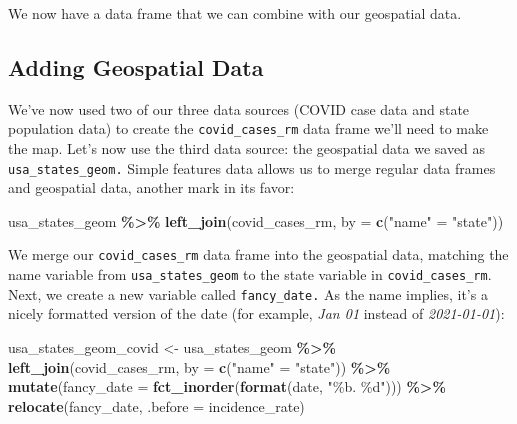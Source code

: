 \documentclass[
]{book}
\newenvironment{Shaded}{\begin{snugshade}}{\end{snugshade}}
\newcommand{\AttributeTok}[1]{\textcolor[rgb]{0.13,0.29,0.53}{#1}}
\newcommand{\FunctionTok}[1]{\textcolor[rgb]{0.13,0.29,0.53}{\textbf{#1}}}
\newcommand{\NormalTok}[1]{#1}
\newcommand{\OtherTok}[1]{\textcolor[rgb]{0.56,0.35,0.01}{#1}}
\newcommand{\SpecialCharTok}[1]{\textcolor[rgb]{0.81,0.36,0.00}{\textbf{#1}}}
\newcommand{\StringTok}[1]{\textcolor[rgb]{0.31,0.60,0.02}{#1}}
\begin{document}
We now have a data frame that we can combine with our geospatial data.

\hypertarget{adding-geospatial-data}{%
\subsection*{Adding Geospatial Data}\label{adding-geospatial-data}}

We've now used two of our three data sources (COVID case data and state population data) to create the \texttt{covid\_cases\_rm} data frame we'll need to make the map. Let's now use the third data source: the geospatial data we saved as \texttt{usa\_states\_geom.} Simple features data allows us to merge regular data frames and geospatial data, another mark in its favor:

\begin{Shaded}
\begin{Highlighting}[]
\NormalTok{usa\_states\_geom }\SpecialCharTok{\%\textgreater{}\%}
  \FunctionTok{left\_join}\NormalTok{(covid\_cases\_rm, }\AttributeTok{by =} \FunctionTok{c}\NormalTok{(}\StringTok{"name"} \OtherTok{=} \StringTok{"state"}\NormalTok{))}
\end{Highlighting}
\end{Shaded}

We merge our \texttt{covid\_cases\_rm} data frame into the geospatial data, matching the name variable from \texttt{usa\_states\_geom} to the state variable in \texttt{covid\_cases\_rm}. Next, we create a new variable called \texttt{fancy\_date.} As the name implies, it's a nicely formatted version of the date (for example, \emph{Jan 01} instead of \emph{2021-01-01}):

\begin{Shaded}
\begin{Highlighting}[]
\NormalTok{usa\_states\_geom\_covid }\OtherTok{\textless{}{-}}\NormalTok{ usa\_states\_geom }\SpecialCharTok{\%\textgreater{}\%}
  \FunctionTok{left\_join}\NormalTok{(covid\_cases\_rm, }\AttributeTok{by =} \FunctionTok{c}\NormalTok{(}\StringTok{"name"} \OtherTok{=} \StringTok{"state"}\NormalTok{)) }\SpecialCharTok{\%\textgreater{}\%}
  \FunctionTok{mutate}\NormalTok{(}\AttributeTok{fancy\_date =} \FunctionTok{fct\_inorder}\NormalTok{(}\FunctionTok{format}\NormalTok{(date, }\StringTok{"\%b. \%d"}\NormalTok{))) }\SpecialCharTok{\%\textgreater{}\%}
  \FunctionTok{relocate}\NormalTok{(fancy\_date, }\AttributeTok{.before =}\NormalTok{ incidence\_rate)}
\end{Highlighting}
\end{Shaded}
\end{document}
